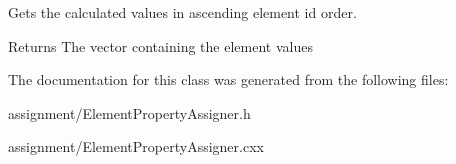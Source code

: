 Gets the calculated values in ascending element id order. 

\begin{DoxyReturn}{Returns}
The vector containing the element values 
\end{DoxyReturn}


The documentation for this class was generated from the following files:\begin{DoxyCompactItemize}
\item 
assignment/ElementPropertyAssigner.h\item 
assignment/ElementPropertyAssigner.cxx\end{DoxyCompactItemize}
